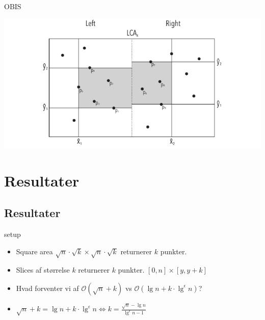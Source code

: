 \documentclass[pdf]{beamer}
\begin{document}
\begin{frame}{OBIS}

  \includegraphics{pictures/ors_step3-eps-converted-to.pdf}
\end{frame}



\section{Resultater}
\subsection{Resultater}

\begin{frame}{setup}
  \begin{itemize}
    \item Square area $\sqrt{n}\cdot\sqrt{k}\times\sqrt{n}\cdot\sqrt{k}$ returnerer $k$ punkter.
    \item Slices af størrelse $k$ returnerer $k$ punkter. $[0,n] \times [y, y+k]$
    \item Hvad forventer vi af $\mathcal{O}(\sqrt{n} + k)$ vs $\mathcal{O}(\lg n + k\cdot\lg^\epsilon n)$?
    \item $\sqrt{n}+k = \lg n + k\cdot\lg^\epsilon n \Leftrightarrow k = \frac{\sqrt{n}-\lg n}{\lg^\epsilon n -1}$
  \end{itemize}
\end{frame}
\end{document}
